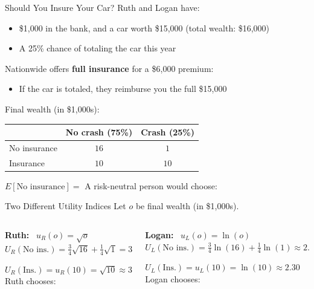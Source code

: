 \begin{frame}{Should You Insure Your Car?}
Ruth and Logan have:
\begin{itemize}
    \item \$1,000 in the bank, and a car worth \$15,000 \hspace{0.5in} (total wealth: \$16,000)
    \item A 25\% chance of totaling the car this year
\end{itemize}
\bsk
Nationwide offers \textbf{full insurance} for a \$6,000 premium:
\begin{itemize}
    \item If the car is totaled, they reimburse you the full \$15,000
\end{itemize}
\bsk
Final wealth (in \$1,000s):
\bsk
\centering
\begin{tabular}{l|c|c|}
\cline{2-3}
 & No crash (75\%) & Crash (25\%) \\
\hline
\multicolumn{1}{|l|}{No insurance} & $16$ & $1$ \\
\hline
\multicolumn{1}{|l|}{Insurance} & $10$ & $10$ \\
\hline
\end{tabular}
\bsk
\raggedright
$E[\text{No insurance}]=$ \underline{\hspace{0.8in}} \hspace{0.3in} A risk-neutral person would choose: \underline{\hspace{0.9in}}
\end{frame}

\begin{frame}{Two Different Utility Indices}
Let $o$ be final wealth (in \$1,000s).
\bsk
\begin{columns}[T,onlytextwidth]
\begin{column}{0.5\textwidth}
\textbf{Ruth:} \ $u_R(o)=\sqrt{o}$
\bsk
$U_R(\text{No ins.})=\tfrac34\sqrt{16}+\tfrac14\sqrt{1}=3.25$
\vspace{0.35in}

$U_R(\text{Ins.})=u_R(10)=\sqrt{10}\approx 3.16$
\bsk
Ruth chooses: \underline{\hspace{1in}}
\end{column}
\begin{column}{0.5\textwidth}
\textbf{Logan:} \ $u_L(o)=\ln(o)$
\bsk
$U_L(\text{No ins.})=\tfrac34\ln(16)+\tfrac14\ln(1)\approx2.0794$
\vspace{0.35in}

$U_L(\text{Ins.})=u_L(10)=\ln(10)\approx 2.30$
\bsk
Logan chooses: \underline{\hspace{1in}}
\end{column}
\end{columns}
\vfill
{}
\vspace{-0.3in}
\end{frame}

